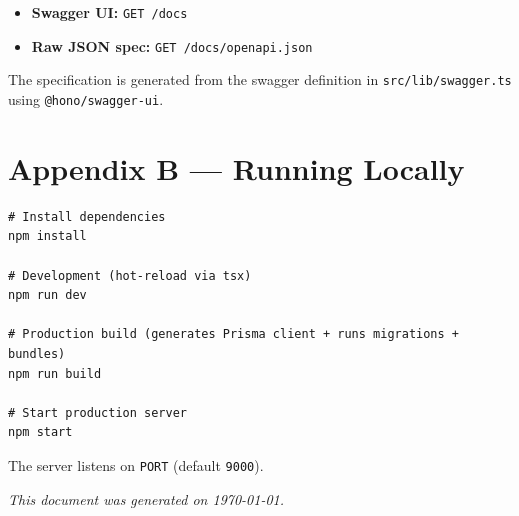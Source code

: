 \documentclass[12pt,a4paper]{article}
\begin{document}
\begin{itemize}
  \item \textbf{Swagger UI:} \texttt{GET /docs}
  \item \textbf{Raw JSON spec:} \texttt{GET /docs/openapi.json}
\end{itemize}

The specification is generated from the swagger definition in \texttt{src/lib/swagger.ts} using \texttt{@hono/swagger-ui}.

\section*{Appendix B — Running Locally}

\begin{lstlisting}
# Install dependencies
npm install

# Development (hot-reload via tsx)
npm run dev

# Production build (generates Prisma client + runs migrations + bundles)
npm run build

# Start production server
npm start
\end{lstlisting}

The server listens on \texttt{PORT} (default \texttt{9000}).

\vspace{1em}
\textit{This document was generated on \today.}
\end{document}
